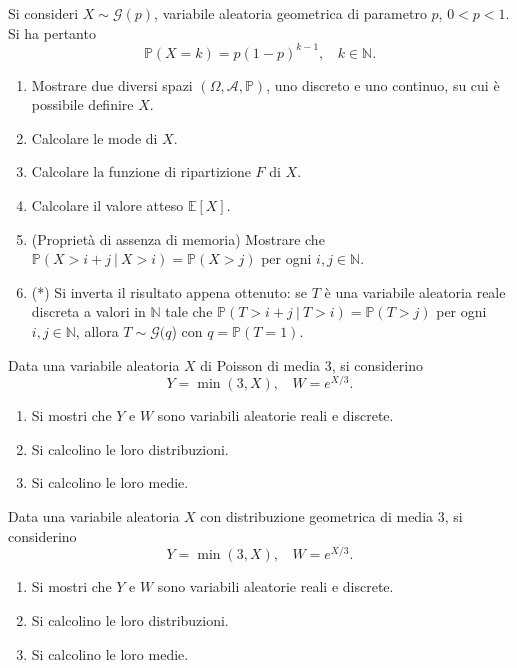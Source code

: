 Si consideri $X\sim \mathcal{G}( p)$, variabile aleatoria geometrica di parametro $p$, $0< p< 1$. Si ha pertanto
\begin{equation*}
\mathbb{P}( X=k) =p( 1-p)^{k-1} ,\ \ \ \ k\in \mathbb{N} .
\end{equation*}
\begin{enumerate}
\item Mostrare due diversi spazi $( \Omega ,\mathcal{A} ,\mathbb{P})$, uno discreto e uno continuo, su cui è possibile definire $X$.
\item Calcolare le mode di $X$.
\item Calcolare la funzione di ripartizione $F$ di $X$.
\item Calcolare il valore atteso $\mathbb{E}[ X]$.
\item (Proprietà di assenza di memoria) Mostrare che $\mathbb{P}( X >i+j\ |\ X >i) =\mathbb{P}( X >j)$ per ogni $i,j\in \mathbb{N}$.
\item (*) Si inverta il risultato appena ottenuto: se $T$ è una variabile aleatoria reale discreta a valori in $\mathbb{N}$ tale che $\mathbb{P}( T >i+j\ |\ T >i) =\mathbb{P}( T >j)$ per ogni $i,j\in \mathbb{N}$, allora $T\sim \mathcal{G}( q$) con $q=\mathbb{P}( T=1)$.
\end{enumerate}
\Esercizio{}

Data una variabile aleatoria $X$ di Poisson di media $3$, si considerino
\begin{equation*}
Y=\min( 3,X) ,\ \ \ \ W=e^{X/3} .
\end{equation*}
\begin{enumerate}
\item Si mostri che $Y$ e $W$ sono variabili aleatorie reali e discrete.
\item Si calcolino le loro distribuzioni.
\item Si calcolino le loro medie.
\end{enumerate}
\Esercizio{}

Data una variabile aleatoria $X$ con distribuzione geometrica di media $3$, si considerino
\begin{equation*}
Y=\min( 3,X) ,\ \ \ \ W=e^{X/3} .
\end{equation*}
\begin{enumerate}
\item Si mostri che $Y$ e $W$ sono variabili aleatorie reali e discrete.
\item Si calcolino le loro distribuzioni.
\item Si calcolino le loro medie.
\end{enumerate}

